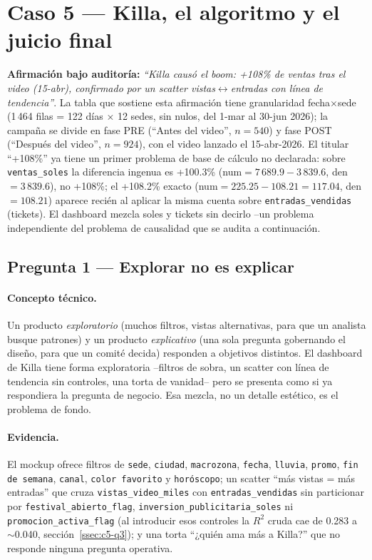 \section{Caso 5 --- Killa, el algoritmo y el juicio final}\label{sec:caso5}

\textbf{Afirmación bajo auditoría:} \emph{``Killa causó el boom: +108\% de ventas tras el video (15-abr), confirmado por un scatter vistas$\leftrightarrow$entradas con línea de tendencia''}. La tabla que sostiene esta afirmación tiene granularidad fecha$\times$sede (1\,464 filas = 122 días $\times$ 12 sedes, sin nulos, del 1-mar al 30-jun 2026); la campaña se divide en fase PRE (``Antes del video'', $n=540$) y fase POST (``Después del video'', $n=924$), con el video lanzado el 15-abr-2026. El titular ``+108\%'' ya tiene un primer problema de base de cálculo no declarada: sobre \texttt{ventas\_soles} la diferencia ingenua es +100.3\% (num$=7\,689.9-3\,839.6$, den$=3\,839.6$), no +108\%; el +108.2\% exacto (num$=225.25-108.21=117.04$, den$=108.21$) aparece recién al aplicar la misma cuenta sobre \texttt{entradas\_vendidas} (tickets). El dashboard mezcla soles y tickets sin decirlo --un problema independiente del problema de causalidad que se audita a continuación.

\subsection{Pregunta 1 --- Explorar no es explicar}\label{ssec:c5-q1}

\paragraph{Concepto técnico.} Un producto \emph{exploratorio} (muchos filtros, vistas alternativas, para que un analista busque patrones) y un producto \emph{explicativo} (una sola pregunta gobernando el diseño, para que un comité decida) responden a objetivos distintos. El dashboard de Killa tiene forma exploratoria --filtros de sobra, un scatter con línea de tendencia sin controles, una torta de vanidad-- pero se presenta como si ya respondiera la pregunta de negocio. Esa mezcla, no un detalle estético, es el problema de fondo.

\paragraph{Evidencia.} El mockup ofrece filtros de \texttt{sede}, \texttt{ciudad}, \texttt{macrozona}, \texttt{fecha}, \texttt{lluvia}, \texttt{promo}, \texttt{fin de semana}, \texttt{canal}, \texttt{color favorito} y \texttt{horóscopo}; un scatter ``más vistas = más entradas'' que cruza \texttt{vistas\_video\_miles} con \texttt{entradas\_vendidas} sin particionar por \texttt{festival\_abierto\_flag}, \texttt{inversion\_publicitaria\_soles} ni \texttt{promocion\_activa\_flag} (al introducir esos controles la $R^2$ cruda cae de 0.283 a $\sim$0.040, sección~\ref{ssec:c5-q3}); y una torta ``¿quién ama más a Killa?'' que no responde ninguna pregunta operativa.

